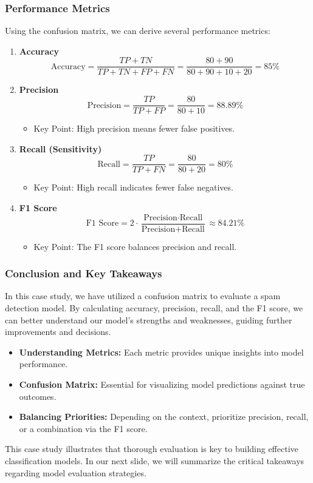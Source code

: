 \documentclass[aspectratio=169]{beamer}
\begin{document}
\begin{frame}[fragile]
    \frametitle{Performance Metrics}
    Using the confusion matrix, we can derive several performance metrics:

    \begin{enumerate}
        \item \textbf{Accuracy}
        \[
        \text{Accuracy} = \frac{TP + TN}{TP + TN + FP + FN} = \frac{80 + 90}{80 + 90 + 10 + 20} = 85\%
        \]

        \item \textbf{Precision}
        \[
        \text{Precision} = \frac{TP}{TP + FP} = \frac{80}{80 + 10} = 88.89\%
        \]
        \begin{itemize}
            \item Key Point: High precision means fewer false positives.
        \end{itemize}

        \item \textbf{Recall (Sensitivity)}
        \[
        \text{Recall} = \frac{TP}{TP + FN} = \frac{80}{80 + 20} = 80\%
        \]
        \begin{itemize}
            \item Key Point: High recall indicates fewer false negatives.
        \end{itemize}

        \item \textbf{F1 Score}
        \[
        \text{F1 Score} = 2 \cdot \frac{\text{Precision} \cdot \text{Recall}}{\text{Precision} + \text{Recall}} \approx 84.21\%
        \]
        \begin{itemize}
            \item Key Point: The F1 score balances precision and recall.
        \end{itemize}
    \end{enumerate}
\end{frame}

\begin{frame}[fragile]
    \frametitle{Conclusion and Key Takeaways}
    In this case study, we have utilized a confusion matrix to evaluate a spam detection model. By calculating accuracy, precision, recall, and the F1 score, we can better understand our model's strengths and weaknesses, guiding further improvements and decisions.

    \begin{itemize}
        \item \textbf{Understanding Metrics:} Each metric provides unique insights into model performance.
        \item \textbf{Confusion Matrix:} Essential for visualizing model predictions against true outcomes.
        \item \textbf{Balancing Priorities:} Depending on the context, prioritize precision, recall, or a combination via the F1 score.
    \end{itemize}

    This case study illustrates that thorough evaluation is key to building effective classification models. In our next slide, we will summarize the critical takeaways regarding model evaluation strategies.
\end{frame}
\end{document}
